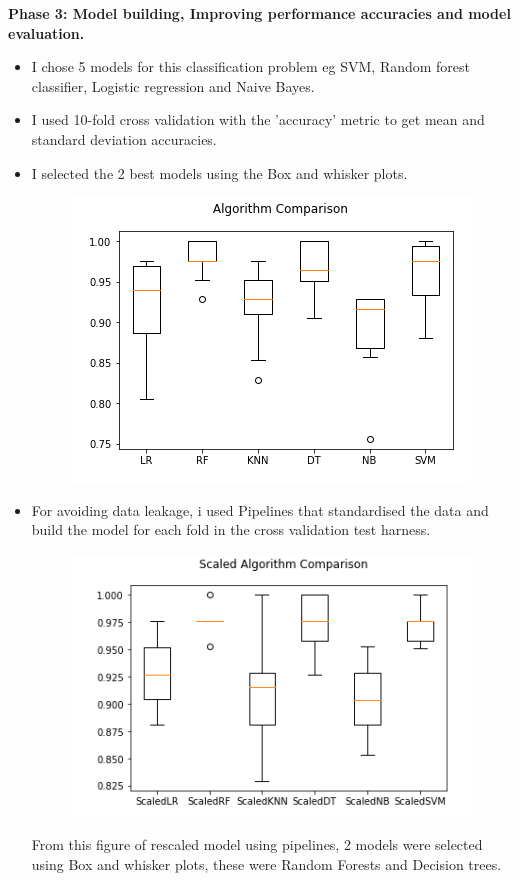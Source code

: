 \documentclass[11pt]{article}
\begin{document}
\textbf{Phase 3: Model building, Improving performance accuracies and model evaluation.}
\begin{itemize}
	\item I chose 5 models for this classification problem eg SVM, Random forest classifier, Logistic regression and Naive Bayes.\\
	\item I used 10-fold cross validation with the 'accuracy' metric to get mean and standard deviation accuracies.\\
	\item I selected the 2 best models using the Box and whisker plots.\\
\newpage
	\begin{figure}[h]
		\centerline{\small 
			\includegraphics[height=0.2\textheight]  {box1}}
	\end{figure}
	
	\item For avoiding data leakage, i used Pipelines that standardised the data and build the model for each fold in the cross validation test harness.\\
	\begin{figure}[h]
		\centerline{\small 
			\includegraphics[height=0.2\textheight]  {box2}}
	\end{figure}
	From this figure of rescaled model using pipelines, 2 models were selected using Box and whisker plots, these were  Random Forests and Decision trees.\\
	

\end{itemize}
\end{document}
